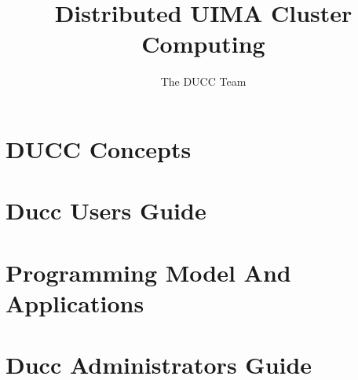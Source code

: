 \documentclass[letterpaper]{book}
\title{\Huge \textbf{Distributed UIMA Cluster Computing}}
\author{The DUCC Team}
\begin{document}
\frontmatter
\maketitle

\tableofcontents
\listoffigures

\mainmatter



\part{DUCC Concepts}




\part{Ducc Users Guide}


\part{Programming Model And Applications}


\part{Ducc Administrators Guide}

\end{document}
